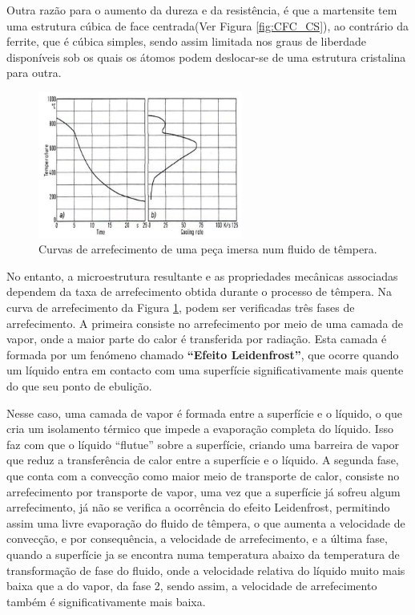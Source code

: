 \par
Outra razão para o aumento da dureza e da resistência, é que a martensite tem uma estrutura cúbica de face centrada(Ver Figura \ref{fig:CFC_CS}), ao contrário da ferrite, que é cúbica simples, sendo assim limitada nos graus de liberdade disponíveis sob os quais os átomos podem deslocar-se de uma estrutura cristalina para outra.
\begin{figure}[htb]
    \centering
    \includegraphics[width = 0.6\textwidth]{Figures/Cap2/Tempera_Arrefecimento.png}
    \caption[Curva de arrefecimento em fluido de têmpera]%
    {Curvas de arrefecimento de uma peça imersa num fluido de têmpera.}
    \label{fig:tempera_arref}
\end{figure}
\par
No entanto, a microestrutura resultante e as propriedades mecânicas associadas dependem da taxa de arrefecimento obtida durante o processo de têmpera. Na curva de arrefecimento da Figura \ref{fig:tempera_arref}, podem ser verificadas três fases de arrefecimento. A primeira consiste no arrefecimento por meio de uma camada de vapor, onde a maior parte do calor é transferida por radiação. Esta camada é formada por um fenómeno chamado \textbf{“Efeito Leidenfrost”}, que ocorre quando um líquido entra em contacto com uma superfície significativamente mais quente do que seu ponto de ebulição. 
\newpage
\par
Nesse caso, uma camada de vapor é formada entre a superfície e o líquido, o que cria um isolamento térmico que impede a evaporação completa do líquido. Isso faz com que o líquido “flutue” sobre a superfície, criando uma barreira de vapor que reduz a transferência de calor entre a superfície e o líquido. A segunda fase, que conta com a convecção como maior meio de transporte de calor, consiste no arrefecimento por transporte de vapor, uma vez que a superfície já sofreu algum arrefecimento, já não se verifica a ocorrência do efeito Leidenfrost, permitindo assim uma livre evaporação do fluido de têmpera, o que aumenta a velocidade de convecção, e por consequência, a velocidade de arrefecimento, e a última fase, quando a superfície ja se encontra numa temperatura abaixo da temperatura de transformação de fase do fluido, onde a velocidade relativa do líquido muito mais baixa que a do vapor, da fase 2, sendo assim, a velocidade de arrefecimento também é significativamente mais baixa.

